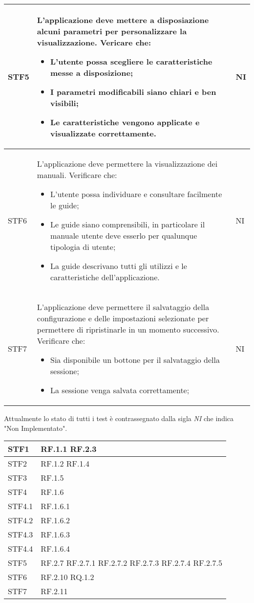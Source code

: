 \begin{longtable}{|p{1.5cm}|p{11cm}|p{1cm}|}
        STF5 & L'applicazione deve mettere a disposiazione alcuni parametri per personalizzare la visualizzazione. Vericare che: \begin{itemize}
            \item L'utente possa scegliere le caratteristiche messe a disposizione;
            \item I parametri modificabili siano chiari e ben visibili;
            \item Le caratteristiche vengono applicate e visualizzate correttamente.
        \end{itemize} & NI\\ \hline

        STF6 & L'applicazione deve permettere la visualizzazione dei manuali. Verificare che: \begin{itemize}
            \item L'utente possa individuare e consultare facilmente le guide;
            \item Le guide siano comprensibili, in particolare il manuale utente deve esserlo per qualunque tipologia di utente;
            \item La guide descrivano tutti gli utilizzi e le caratteristiche dell'applicazione.
        \end{itemize}& NI\\ \hline

        STF7 & L'applicazione deve permettere il salvataggio della configurazione e delle impostazioni selezionate per permettere di ripristinarle in un momento successivo. Verificare che: \begin{itemize}
            \item Sia disponibile un bottone per il salvataggio della sessione;
            \item La sessione venga salvata correttamente;
        \end{itemize}& NI\\ \hline
    \end{longtable}

    Attualmente lo stato di tutti i test è contrassegnato dalla sigla \textit{NI} che indica "Non Implementato".

    \begin{longtable}{|p{1.5cm}|p{11cm}|} \hline
        STF1 & RF.1.1 RF.2.3\\ \hline
        STF2 & RF.1.2 RF.1.4 \\ \hline
        STF3 & RF.1.5 \\ \hline
        STF4 & RF.1.6 \\ \hline
        STF4.1 & RF.1.6.1 \\ \hline
        STF4.2 & RF.1.6.2 \\ \hline
        STF4.3 & RF.1.6.3 \\ \hline
        STF4.4 & RF.1.6.4 \\ \hline
        STF5 & RF.2.7 RF.2.7.1 RF.2.7.2 RF.2.7.3 RF.2.7.4 RF.2.7.5\\ \hline
        STF6 & RF.2.10 RQ.1.2 \\ \hline
        STF7 & RF.2.11 \\ \hline

    \end{longtable}